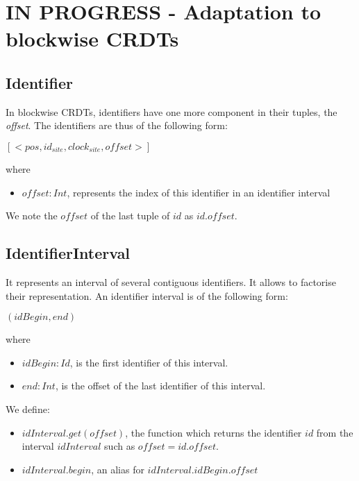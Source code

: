 \documentclass[a4paper]{article}
\begin{document}
\section{IN PROGRESS - Adaptation to blockwise \acp{CRDT}}

\subsection{Identifier}

In blockwise \acp{CRDT}, identifiers have one more component in their tuples, the \emph{offset}.
The identifiers are thus of the following form:

\begin{center}
  $[<pos, id_{site}, clock_{site}, offset>]$
\end{center}
where
\begin{itemize}
  \item $offset: Int$, represents the index of this identifier in an identifier interval
\end{itemize}

We note the $offset$ of the last tuple of $id$ as $id.offset$.

\subsection{IdentifierInterval}

It represents an interval of several contiguous identifiers.
It allows to factorise their representation.
An identifier interval is of the following form:

\begin{center}
  $(idBegin, end)$
\end{center}
where
\begin{itemize}
  \item $idBegin: Id$, is the first identifier of this interval.
  \item $end: Int$, is the offset of the last identifier of this interval.
\end{itemize}

We define:
\begin{itemize}
  \item $idInterval.get(offset)$, the function which returns the identifier $id$
    from the interval $idInterval$ such as $offset = id.offset$.
  \item $idInterval.begin$, an alias for $idInterval.idBegin.offset$
\end{itemize}
\end{document}
